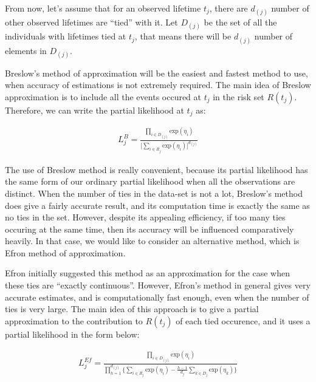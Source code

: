 \documentclass[]{article}
\begin{document}
From now, let's assume that for an observed lifetime \(t_j\), there are
\(d_{(j)}\) number of other observed lifetimes are ``tied'' with it. Let
\(D_{(j)}\) be the set of all the individuals with lifetimes tied at
\(t_j\), that means there will be \(d_{(j)}\) number of elements in
\(D_{(j)}\).

Breslow's method of approximation will be the easiest and fastest method
to use, when accuracy of estimations is not extremely required. The main
idea of Breslow approximation is to include all the events occured at
\(t_j\) in the risk set \(R(t_j)\). Therefore, we can write the partial
likelihood at \(t_j\) as:

\begin{equation}\begin{aligned}\label{eqn:tie1forBres}
L_j^B = \frac{\prod_{i \in D_{(j)}} \text{exp}(\eta_i)}{\big[ \sum_{i\in R_{j}} \text{exp}(\eta_i) \big]^{d_{(j)}}}
\end{aligned}\end{equation}

The use of Breslow method is really convenient, because its partial
likelihood has the same form of our ordinary partial likelihood when all
the observations are distinct. When the number of ties in the data-set
is not a lot, Breslow's method does give a fairly accurate result, and
its computation time is exactly the same as no ties in the set. However,
despite its appealing efficiency, if too many ties occuring at the same
time, then its accuracy will be influenced comparatively heavily. In
that case, we would like to consider an alternative method, which is
Efron method of approximation.

Efron initially suggested this method as an approximation for the case
when these ties are ``exactly continuous''. However, Efron's method in
general gives very accurate estimates, and is computationally fast
enough, even when the number of ties is very large. The main idea of
this approach is to give a partial approximation to the contribution to
\(R(t_j)\) of each tied occurence, and it uses a partial likelihood in
the form below:

\begin{equation}\begin{aligned}\label{eqn:tie1forEf}
L_j^{Ef} = \frac{\prod_{i \in D_{(j)}} \text{exp}(\eta_i)}{\prod_{h = 1}^{d_{(j)}} \bigg \{\sum_{i\in R_{j}} \text{exp}(\eta_i) - \frac{h-1}{d_j}\sum_{k\in D_{j}} \text{exp}(\eta_k) \bigg \}}
\end{aligned}\end{equation}
\end{document}
